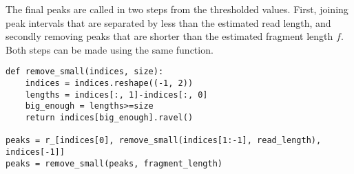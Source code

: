 The final peaks are called in two steps from the thresholded values. First, joining peak intervals that are separated by less than the estimated read length, and secondly removing peaks that are shorter than the estimated fragment length $f$. Both steps can be made using the same function.
\begin{lstlisting}
def remove_small(indices, size):
    indices = indices.reshape((-1, 2))
    lengths = indices[:, 1]-indices[:, 0]
    big_enough = lengths>=size
    return indices[big_enough].ravel()

peaks = r_[indices[0], remove_small(indices[1:-1], read_length), indices[-1]]
peaks = remove_small(peaks, fragment_length)
\end{lstlisting}


% 
% 
% 
% 
% 
% 
% 
% 
% 
% 
% 
% 
% 
% 
% 
% 
% 
% 
% 
% 
% 
% 
% 
% 
% 
% 
% 
% 
% 
% 
% 
% 
% 
% 
% 
% 
% 
% 
% 
% 
% 
% 
% 
% 
% 
% 
% 
% 
% 
% 
% 


